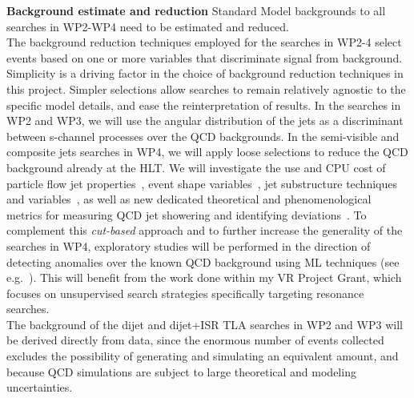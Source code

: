 \textbf{Background estimate and reduction}
Standard Model backgrounds to all searches in WP2-WP4 need to be estimated and reduced. \\
\noindent
The background reduction techniques employed for the searches in WP2-4 select events based on one or more variables that discriminate signal from background.
Simplicity is a driving factor in the choice of background reduction techniques in this project. 
Simpler selections allow searches to remain relatively agnostic to the specific model details, and ease the reinterpretation of results.
In the searches in WP2 and WP3, we will use the angular distribution of the jets as a discriminant between s-channel processes over the QCD backgrounds. 
In the semi-visible and composite jets searches in WP4, we will apply loose selections to reduce the QCD background already at the HLT. 
We will investigate the use and CPU cost of particle flow jet properties~\cite{Aaboud:2017aca}, %
event shape variables~\cite{STDM-2011-33}, %
jet substructure techniques and variables~\cite{Larkoski:2017jix}, %
as well as new dedicated theoretical and phenomenological metrics for measuring QCD jet showering and identifying deviations~\cite{Dreyer:2018nbf,Komiske:2019fks}. %
To complement this \textit{cut-based} approach and to further increase the generality of the searches in WP4, exploratory studies will be performed in the direction of detecting anomalies over the known QCD background using ML techniques (see e.g.~\cite{Cerri:2018anq,DAgnolo:2019vbw,Collins:2019jip}). %
This will benefit from the work done within my VR Project Grant, which focuses on unsupervised search strategies specifically targeting resonance searches.
\\
\noindent
The background of the dijet and dijet+ISR TLA searches in WP2 and WP3 will be derived directly from data, since the enormous number of events collected excludes the possibility of generating and simulating an equivalent amount, and because QCD simulations are subject to large theoretical and modeling uncertainties.  
